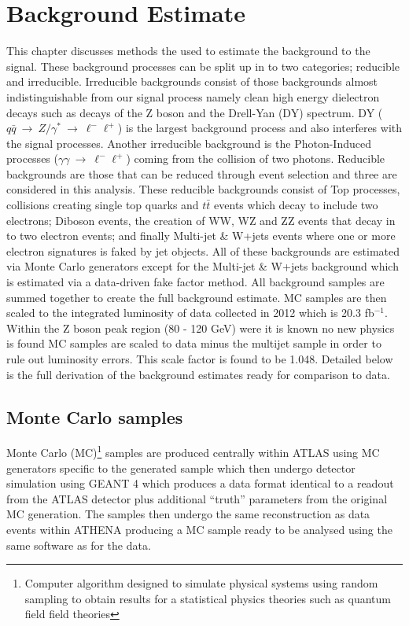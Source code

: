 \chapter{Background Estimate}

This chapter discusses methods the used to estimate the background to the signal. These background processes can be split up in to two categories; reducible and irreducible. Irreducible backgrounds consist of those backgrounds almost indistinguishable from our signal process namely clean high energy dielectron decays such as decays of the Z boson and the Drell-Yan (DY) spectrum. DY ($q\bar{q}~\rightarrow~Z/\gamma^{*}~\rightarrow~\ell^{-}\ell^{+}$) is the largest background process and also interferes with the signal processes. Another irreducible background is the Photon-Induced processes ($\gamma\gamma~\rightarrow~\ell^{-}\ell^{+}$) coming from the collision of two photons. Reducible backgrounds are those that can be reduced through event selection and three are considered in this analysis. These reducible backgrounds consist of Top processes, collisions creating single top quarks and $t\bar{t}$ events which decay to include two electrons; Diboson events, the creation of WW, WZ and ZZ events that decay in to two electron events; and finally Multi-jet \& W+jets events where one or more electron signatures is faked by jet objects. All of these backgrounds are estimated via Monte Carlo generators except for the Multi-jet \& W+jets background which is estimated via a data-driven fake factor method. All background samples are summed together to create the full background estimate. MC samples are then scaled to the integrated luminosity of data collected in 2012 which is 20.3 fb$^{-1}$. Within the Z boson peak region (80 - 120 GeV) were it is known no new physics is found MC samples are scaled to data minus the multijet sample in order to rule out luminosity errors. This scale factor is found to be 1.048. Detailed below is the full derivation of the background estimates ready for comparison to data.

\section{Monte Carlo samples}
   \label{sec:MC}

   Monte Carlo (MC)\footnote{Computer algorithm designed to simulate physical systems using random sampling to obtain results for a statistical physics theories such as quantum field field theories} samples are produced centrally within ATLAS using MC generators specific to the generated sample which then undergo detector simulation using GEANT 4 \cite{Agostinelli2003250} which produces a data format identical to a readout from the ATLAS detector plus additional ``truth'' parameters from the original MC generation. The samples then undergo the same reconstruction as data events within ATHENA producing a MC sample ready to be analysed using the same software as for the data.\\


